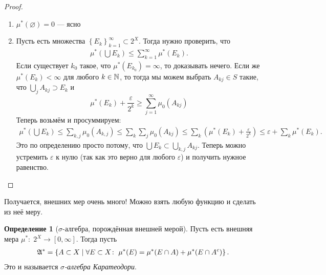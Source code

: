 \documentclass[a4paper,12pt]{article}
\newcounter{theoremCnt}
\theoremstyle{definition}
\newtheorem{df}[theoremCnt]{Определение}
\theoremstyle{plain}
\theoremstyle{plain}
\theoremstyle{plain}
\theoremstyle{plain}
\theoremstyle{definition}
\theoremstyle{definition}
\theoremstyle{definition}
\theoremstyle{definition}
\theoremstyle{definition}
\theoremstyle{definition}
\theoremstyle{plain}
\theoremstyle{plain}
\theoremstyle{plain}
\theoremstyle{plain}
\theoremstyle{definition}
\theoremstyle{definition}
\theoremstyle{definition}
\theoremstyle{definition}
\theoremstyle{definition}
\newcommand{\N}{\ensuremath \mathbb{N}}
\newcommand{\A}{\ensuremath \mathfrak{A}}
\begin{document}
\begin{proof}\
 \begin{enumerate}
  \item $ \mu^\ast(\varnothing) = 0 $ --- ясно
  \item Пусть есть множества $ \left\{ E_k \right\}_{k=1}^\infty \subset 2^X$. Тогда нужно проверить, что
   \begin{align*}
    \mu^\ast\left( \bigcup E_k \right) \leqslant \sum_{k=1}^{\infty} \mu^\ast(E_k)
   .\end{align*} Если существует $ k_0 $ такое, что $ \mu^\ast(E_{k_0}) = \infty $, то доказывать нечего. Если же $ \mu^\ast(E_k) < \infty $ для любого $ k \in \N $, то тогда мы можем выбрать $ A_{kj} \in S $ такие, что $ \bigcup_j A_{kj} \supset E_k $ и $$ \mu^\ast(E_k) + \frac{\varepsilon}{2^k} \geqslant \sum_{j=1}^{\infty} \mu_0(A_{kj}) $$ Теперь возьмём и просуммируем:
   \begin{align*}
    \mu^\ast\left( \bigcup E_k \right) \leqslant \sum_{k,j} \mu_0(A_{k,j}) \leqslant \sum_k \sum_j \mu_0(A_{kj}) \leqslant \sum_{k} \left(\mu^\ast(E_k) + \frac{\varepsilon}{2^k} \right) \leqslant \varepsilon + \sum_k \mu^\ast(E_k)
   .\end{align*} Это по определению просто потому, что $ \bigcup E_k \subset \bigcup_{k,j} A_{kj} $. Теперь можно устремить $ \varepsilon $ к нулю (так как это верно для любого $ \varepsilon $) и получить нужное равенство.
 \end{enumerate}
\end{proof}
Получается, внешних мер очень много! Можно взять любую функцию и сделать из неё меру.

\begin{df}[$ \sigma $-алгебра, порождённая внешней мерой]
 Пусть есть внешняя мера $ \mu^\ast \colon\; 2^X \to [0,\infty] $. Тогда пусть \begin{align*}
  \A^\ast = \left\{ A \subset X \mid \forall E \subset X \colon\; \mu^\ast(E) = \mu^\ast (E \cap A) + \mu^\ast(E \cap A^c) \right\} 
 .\end{align*}
 Это и называется \textit{$ \sigma $-алгебра Каратеодори}.
\end{df}
\end{document}
